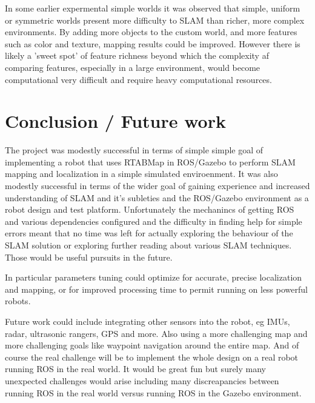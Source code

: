 \documentclass[10pt,journal,compsoc]{IEEEtran}
\begin{document}
In some earlier expermental simple worlds it was observed that simple, uniform or symmetric worlds present more difficulty to SLAM than richer, more complex environments. By adding more objects to the custom world, and more features such as color and texture, mapping results could be improved. However there is likely a 'sweet spot' of feature richness beyond which the complexity af comparing features, especially in a large environment, would become computational very difficult and require heavy computational resources.

\section{Conclusion / Future work}
The project was modestly successful in terms of simple simple goal of implementing a robot that uses RTABMap in ROS/Gazebo to perform SLAM mapping and localization in a simple simulated enviroenment. It was also modestly successful in terms of the wider goal of gaining experience and increased understanding of SLAM and it's subleties and the ROS/Gazebo environment as a robot design and test platform. Unfortunately the mechanincs of getting ROS and various dependencies configured and the difficulty in finding help for simple errors meant that no time was left for actually exploring the behaviour of the SLAM solution or exploring further reading about various SLAM techniques. Those would be useful pursuits in the future.

In particular parameters tuning could optimize for accurate, precise localization and mapping, or for improved processing time to permit running on less powerful robots. 

Future work could include integrating other sensors into the robot, eg IMUs, radar, ultrasonic rangers, GPS and more. Also using a more challenging map and more challenging goals like waypoint navigation around the entire map. And of course the real challenge will be to implement the whole design on a real robot running ROS in the real world. It would be great fun but surely many unexpected challenges would arise including many discreapancies between running ROS in the real world versus running ROS in the Gazebo environment. 
\end{document}
